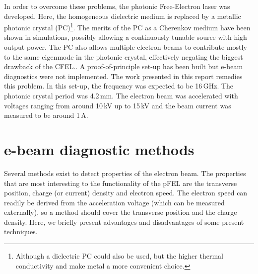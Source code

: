 In order to overcome these problems, the photonic Free-Electron laser was developed. Here, the homogeneous dielectric medium is replaced by a metallic photonic crystal (PC)\footnote{Although a dielectric PC could also be used, but the higher thermal conductivity and  make metal a more convenient choice.}.
The merits of the PC as a Cherenkov medium have been shown in simulations, possibly allowing a continuously tunable source with high output power.
The PC also allows multiple electron beams to contribute mostly to the same eigenmode in the photonic crystal, effectively negating the biggest drawback of the CFEL.\cite{DenisMultiBeam}.
A proof-of-principle set-up has been built \cite{Denis} but e-beam diagnostics were not implemented. The work presented in this report remedies this problem.
In this set-up, the frequency was expected to be 16\,GHz. The photonic crystal period was 4.2\,mm. The electron beam was accelerated with voltages ranging from around 10\,kV up to 15\,kV and the beam current was measured to be around 1\,A.

\section{e-beam diagnostic methods}
Several methods exist to detect properties of the electron beam. The properties that are most interesting to the functionality of the pFEL are the transverse position, charge (or current) density and electron speed. The electron speed can readily be derived from the acceleration voltage (which can be measured externally), so a method should cover the transverse position and the charge density. 
Here, we briefly present advantages and disadvantages of some present techniques.

